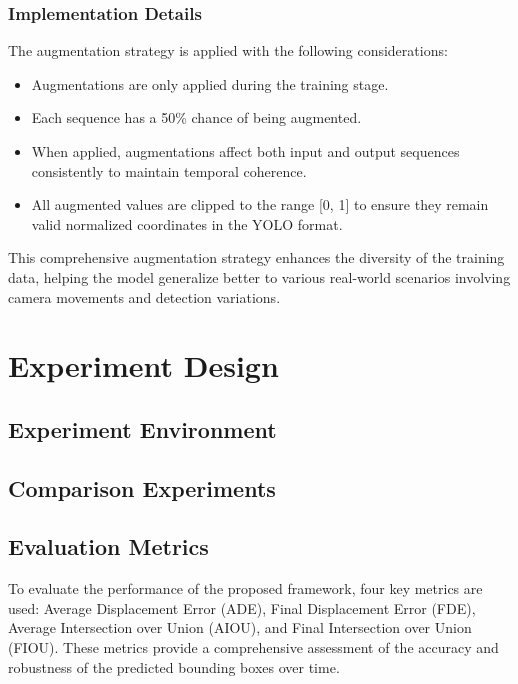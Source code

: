 \documentclass[12pt,oneside]{book} %
\begin{document}
\subsection{Implementation Details}

The augmentation strategy is applied with the following considerations:

\begin{itemize}
    \item Augmentations are only applied during the training stage.
    \item Each sequence has a 50\% chance of being augmented.
    \item When applied, augmentations affect both input and output sequences consistently
          to maintain temporal coherence.
    \item All augmented values are clipped to the range [0, 1] to ensure they remain
          valid normalized coordinates in the YOLO format.
\end{itemize}

This comprehensive augmentation strategy enhances the diversity of the training
data, helping the model generalize better to various real-world scenarios
involving camera movements and detection variations.

\chapter{Experiment Design}\label{chap:experiment_design}
\section{Experiment Environment}

\section{Comparison Experiments}

\section{Evaluation Metrics}

To evaluate the performance of the proposed framework, four key metrics are
used: Average Displacement Error (ADE), Final Displacement Error (FDE), Average
Intersection over Union (AIOU), and Final Intersection over Union (FIOU). These
metrics provide a comprehensive assessment of the accuracy and robustness of
the predicted bounding boxes over time.
\end{document}
